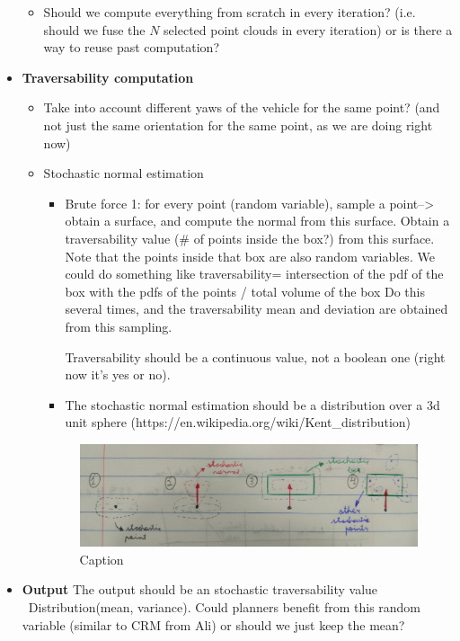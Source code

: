 \documentclass[letterpaper, 10 pt, conference]{ieeeconf}  %
\begin{document}
\begin{itemize}
\begin{itemize}
		\item Should we compute everything from scratch in every iteration? (i.e. should we fuse the $N$ selected point clouds in every iteration) or is there a way to reuse past computation?
	\end{itemize}

    \item \textbf{Traversability computation}
    
        \begin{itemize}
		\item Take into account different yaws of the vehicle for the same point? (and not just the same orientation for the same point, as we are doing right now)
		\item Stochastic normal estimation
		\begin{itemize}
		    \item Brute force 1:  for every point (random variable), sample a point--> obtain a surface, and compute the normal  from this surface. Obtain a traversability value (# of points inside the box?) from this surface. Note that the points inside that box are also random variables. We could do something like traversability= intersection of the pdf of the box with the pdfs of the points / total volume of the box
		    Do this several times, and the traversability mean and deviation are obtained from this sampling.
		    
		    Traversability should be a continuous value, not a boolean one (right now it's yes or no). 
		    \item The stochastic normal estimation should be a distribution over a 3d unit sphere (https://en.wikipedia.org/wiki/Kent_distribution)
		\end{itemize}
		
		\begin{figure}
		    \centering
		    \includegraphics[width=\textwidth]{./figs/stochastic_trav.PNG}
		    \caption{Caption}
		    \label{fig:my_label}
		\end{figure}
		
	\end{itemize}

    \item \textbf{Output} The output should be an stochastic traversability value ~Distribution(mean, variance). Could planners benefit from this random variable (similar to CRM from Ali) or should we just keep the mean? 
    
\end{itemize}





\end{document}
